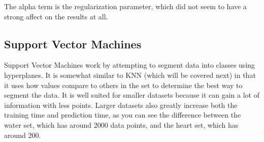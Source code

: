 \documentclass[
	letterpaper, %
]{mlreport}
\begin{document}
The alpha term is the regularization parameter, which did not seem to have a strong affect on the results at all.

\subsection{Support Vector Machines}
Support Vector Machines work by attempting to segment data into classes using hyperplanes. It is somewhat similar to KNN (which will be covered next) in that it uses how values compare to others in the set to determine the best way to segment the data. It is well suited for smaller datasets because it can gain a lot of information with less points. Larger datasets also greatly increase both the training time and prediction time, as you can see the difference between the water set, which has around 2000 data points, and the heart set, which has around 200.
\end{document}
